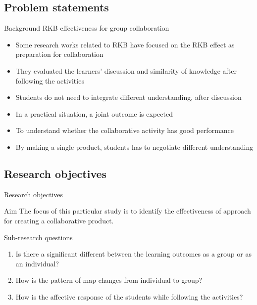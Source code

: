 \subsection{Problem statements}
\begin{frame}{Background}
    RKB effectiveness for group collaboration
\begin{itemize}
    \item Some research works related to RKB \cite{Wunnasri2018ReciprocalUnderstanding,Wunnasri2018ReciprocalCollaboration}
    have focused on the RKB effect as preparation for collaboration
    \item They evaluated the learners' discussion and similarity of
    knowledge after following the activities
    \item Students do not need to integrate different understanding, after 
    discussion 
    \item In a practical situation, a joint outcome is expected
    \item To understand whether the collaborative activity has good performance
    \item By making a single product, students has to negotiate different understanding
\end{itemize}
\end{frame}

\subsection{Research objectives}
\begin{frame}{Research objectives}

\begin{block}{Aim}
    The focus of this particular study is to identify the effectiveness
    of approach for creating a collaborative product.
\end{block}

\begin{alertblock}{Sub-research questions}
    \begin{enumerate}
        \item Is there a significant different between the learning outcomes as a group
        or as an individual?
        \item How is the pattern of map changes from individual to group?
        \item How is the affective response of the students while following the activities?
\end{enumerate}
\end{alertblock}

\end{frame}

